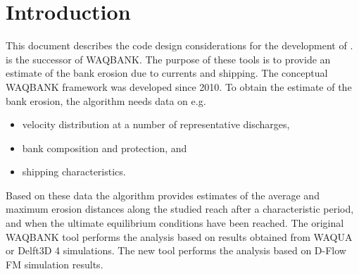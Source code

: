 \chapter{Introduction}

This document describes the code design considerations for the development of \dfastbe.
\dfastbe is the successor of WAQBANK.
The purpose of these tools is to provide an estimate of the bank erosion due to currents and shipping.
The conceptual WAQBANK framework was developed since 2010.
To obtain the estimate of the bank erosion, the algorithm needs data on e.g.

\begin{itemize}
\item velocity distribution at a number of representative discharges,
\item bank composition and protection, and
\item shipping characteristics.
\end{itemize}

Based on these data the algorithm provides estimates of the average and maximum erosion distances along the studied reach after a characteristic period, and when the ultimate equilibrium conditions have been reached.
The original WAQBANK tool performs the analysis based on results obtained from WAQUA or Delft3D 4 simulations.
The new \dfastbe tool performs the analysis based on D-Flow FM simulation results.